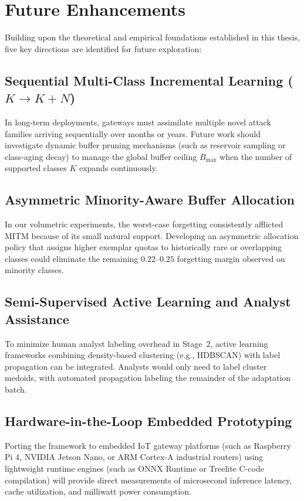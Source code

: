 \section{Future Enhancements}
\label{sec:future_enhancement}

Building upon the theoretical and empirical foundations established in this thesis, five key directions are identified for future exploration:

\subsection{Sequential Multi-Class Incremental Learning ($K \to K+N$)}
In long-term deployments, gateways must assimilate multiple novel attack families arriving sequentially over months or years. Future work should investigate dynamic buffer pruning mechanisms (such as reservoir sampling or class-aging decay) to manage the global buffer ceiling $B_{\max}$ when the number of supported classes $K$ expands continuously.

\subsection{Asymmetric Minority-Aware Buffer Allocation}
In our volumetric experiments, the worst-case forgetting consistently afflicted MITM because of its small natural support. Developing an asymmetric allocation policy that assigns higher exemplar quotas to historically rare or overlapping classes could eliminate the remaining $0.22\text{--}0.25$ forgetting margin observed on minority classes.

\subsection{Semi-Supervised Active Learning and Analyst Assistance}
To minimize human analyst labeling overhead in Stage~2, active learning frameworks combining density-based clustering (e.g., HDBSCAN) with label propagation can be integrated. Analysts would only need to label cluster medoids, with automated propagation labeling the remainder of the adaptation batch.

\subsection{Hardware-in-the-Loop Embedded Prototyping}
Porting the framework to embedded IoT gateway platforms (such as Raspberry Pi 4, NVIDIA Jetson Nano, or ARM Cortex-A industrial routers) using lightweight runtime engines (such as ONNX Runtime or Treelite C-code compilation) will provide direct measurements of microsecond inference latency, cache utilization, and milliwatt power consumption.


